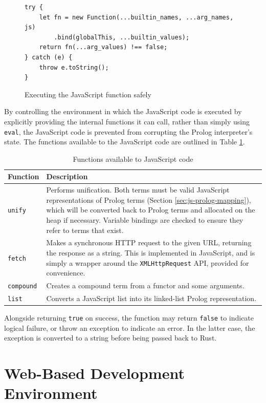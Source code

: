 \begin{figure}[H]
\centering
\begin{verbatim}
try {
    let fn = new Function(...builtin_names, ...arg_names, js)
        .bind(globalThis, ...builtin_values);
    return fn(...arg_values) !== false;
} catch (e) {
    throw e.toString();
}
\end{verbatim}
\caption{Executing the JavaScript function safely}
\label{fig:js-execution}
\end{figure}

By controlling the environment in which the JavaScript code is executed by explicitly providing the internal functions it can call, rather than simply using \texttt{eval}, the JavaScript code is prevented from corrupting the Prolog interpreter's state. The functions available to the JavaScript code are outlined in Table \ref{tab:js-ffi}.

\begin{table}[H]
\centering
\begin{tabular}{lp{12cm}}
\hline
\textbf{Function} & \textbf{Description} \\
\hline
\texttt{unify} & Performs unification. Both terms must be valid JavaScript representations of Prolog terms (Section \ref{sec:js-prolog-mapping}), which will be converted back to Prolog terms and allocated on the heap if necessary. Variable bindings are checked to ensure they refer to terms that exist. \\
\texttt{fetch} & Makes a synchronous HTTP request to the given URL, returning the response as a string. This is implemented in JavaScript, and is simply a wrapper around the \texttt{XMLHttpRequest} API, provided for convenience. \\
\texttt{compound} & Creates a compound term from a functor and some arguments. \\
\texttt{list} & Converts a JavaScript list into its linked-list Prolog representation. \\
\hline
\end{tabular}
\caption{Functions available to JavaScript code}
\label{tab:js-ffi}
\end{table}

Alongside returning \texttt{true} on success, the function may return \texttt{false} to indicate logical failure, or throw an exception to indicate an error. In the latter case, the exception is converted to a string before being passed back to Rust.

\section{Web-Based Development Environment}

